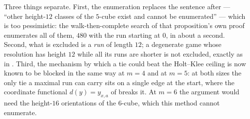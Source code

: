 \begin{remark}\label{mw:no-twelve-scope}
Three things separate. First, the enumeration replaces the sentence after
 --- ``other height-$12$ classes of the $5$-cube exist and
cannot be enumerated'' --- which is too pessimistic: the walk-then-complete
search of that proposition's own proof enumerates all of them, $480$ with the
run starting at $0$, in about a second. Second, what is excluded is a
\emph{run} of length $12$; a degenerate game whose resolution has height $12$
while all its runs are shorter is not excluded, exactly as in
. Third, the mechanism by which a tie could beat the
Holt--Klee ceiling is now known to be blocked in the same way at $m=4$ and at
$m=5$: at both sizes the only tie a maximal run can carry sits on a single
edge at the start, where the coordinate functional $d(y)=y_{x,a}$ of
 breaks it. At $m=6$ the argument would need the
height-$16$ orientations of the $6$-cube, which this method cannot enumerate.
\end{remark}


